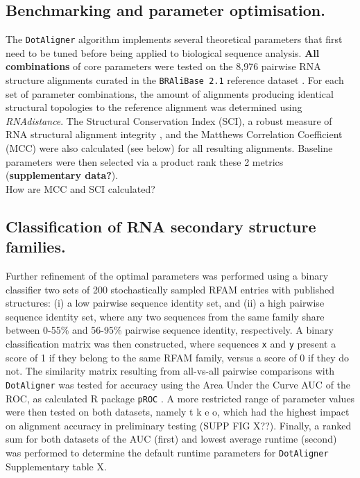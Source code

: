 \documentclass[a4paper,11pt]{article}
\newcommand\dotaligner{\texttt{DotAligner}}
\newcommand\bralibase{\texttt{BRAliBase 2.1}}
\begin{document}
\subsection*{ Benchmarking and parameter optimisation. }
The \dotaligner{} algorithm implements several theoretical parameters that first need to 
be tuned before being applied to biological sequence analysis.\textbf{ All combinations} of 
core parameters were tested on the 8,976 pairwise RNA structure alignments curated in the 
\bralibase{} reference dataset \cite{Wilm2006enhanced}. For each set of parameter combinations, 
the amount of alignments producing identical structural topologies to the reference alignment
was determined using \textit{RNAdistance}. The Structural Conservation Index (SCI), a robust 
measure of RNA structural alignment integrity \cite{gruber2008strategies}, and the Matthews Correlation Coefficient (MCC) were also calculated (see below) for all resulting alignments. 
Baseline parameters were then selected via a product rank these 2 metrics 
(\textbf{supplementary data?}).\\

{\color{red} How are MCC and SCI calculated? }\\

\subsection*{ Classification of RNA secondary structure families. }

Further refinement of the optimal parameters was performed using a binary classifier two sets of 
200 stochastically sampled RFAM entries with published structures: 
(i) a low pairwise sequence identity set, and (ii) a high pairwise sequence identity set, 
where any two sequences from the same family share between 0-55\% and 56-95\% pairwise sequence identity, respectively. A binary classification matrix was then constructed, where sequences \texttt{x} and \texttt{y}
present a score of 1 if they belong to the same RFAM family, versus a score of 0 if they do not. 
The similarity matrix resulting from all-vs-all pairwise comparisons with \dotaligner{} was tested for 
accuracy using the Area Under the Curve AUC of the ROC, as calculated R package \texttt{pROC} \cite{robin2011proc}. 
A more restricted range of parameter values were then tested on both datasets, {\color{red} namely t k e o, which had the highest impact on alignment accuracy in preliminary testing (SUPP FIG X??)}. Finally, a ranked sum for both datasets of the AUC (first) and lowest average runtime (second) was performed to determine the default runtime parameters for \dotaligner{} {\color{red} Supplementary table X}. \\
\end{document}
